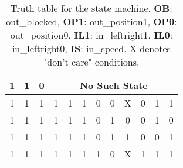 \begin{table}[H]
\begin{tabular}{|c|c|c|c|c|c|c|c|c|c|c|c|}
        1 & 1 & 0 & \multicolumn{9}{c|}{No Such State} \\ \hline
        1 & 1 & 1 & 1 & 1 & 1 & 0 & 0 & X & 0 & 1 & 1 \\ \hline
        1 & 1 & 1 & 1 & 1 & 1 & 0 & 1 & 0 & 0 & 1 & 0 \\ \hline
        1 & 1 & 1 & 1 & 1 & 1 & 0 & 1 & 1 & 0 & 0 & 1 \\ \hline
        1 & 1 & 1 & 1 & 1 & 1 & 1 & 0 & X & 1 & 1 & 1 \\ \hline
    \end{tabular}
    \caption{Truth table for the state machine. \textbf{OB}: out\_blocked, \textbf{OP1}: out\_position1, \textbf{OP0}: out\_position0, \textbf{IL1}: in\_leftright1, \textbf{IL0}: in\_leftright0, \textbf{IS}: in\_speed. X denotes "don't care" conditions.}
    \label{tab:truth_table}
\end{table}

\newpage

